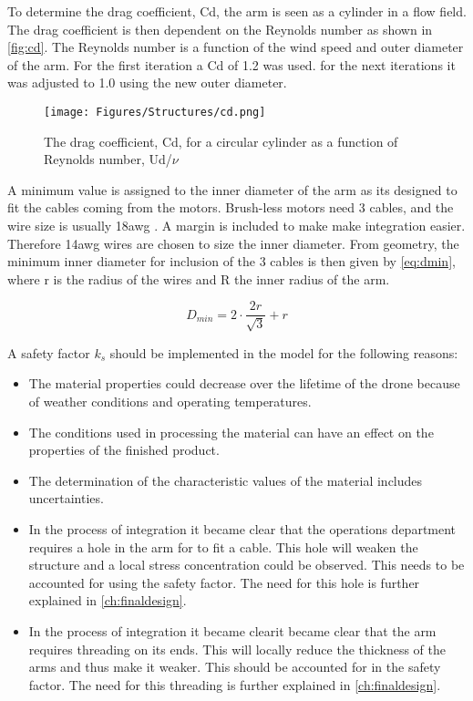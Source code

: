 To determine the drag coefficient, Cd, the arm is seen as a cylinder in a flow field. The drag coefficient is then dependent on the Reynolds number as shown in \autoref{fig:cd}. The Reynolds number is a function of the wind speed and outer diameter of the arm. For the first iteration a Cd of 1.2 was used. for the next iterations it was adjusted to 1.0 using the new outer diameter.

\begin{figure}[H]
    \centering
    \texttt{[image: Figures/Structures/cd.png]}
    \caption{The drag coefficient, Cd, for a circular cylinder as a function of Reynolds number, Ud/$\nu$ \cite{cd}}
    \label{fig:cd}
\end{figure}

A minimum value is assigned to the inner diameter of the arm as its designed to fit the cables coming from the motors. Brush-less motors need 3 cables, and the wire size is usually 18awg \cite{wiresize}. A margin is included to make make integration easier. Therefore 14awg wires are chosen to size the inner diameter. From geometry, the minimum inner diameter for inclusion of the 3 cables is then given by \autoref{eq:dmin}, where r is the radius of the wires and R the inner radius of the arm.

\begin{equation}\label{dmin}
    D_{min} = 2\cdot \frac{2r}{\sqrt{3}}+r
\end{equation}

A safety factor $k_s$ should be implemented in the model for the following reasons:
\begin{itemize}[noitemsep,nolistsep]
    \item The material properties could decrease over the lifetime of the drone because of weather conditions and operating temperatures.
    \item The conditions used in processing the material can have an effect on the properties of the finished product.
    \item The determination of the characteristic values of the material includes uncertainties.
    \item In the process of integration it became clear that the operations department requires a hole in the arm for to fit a cable. This hole will weaken the structure and a local stress concentration could be observed. This needs to be accounted for using the safety factor. The need for this hole is further explained in \autoref{ch:finaldesign}.
    \item In the process of integration it became clearit became clear that the arm requires threading on its ends. This will locally reduce the thickness of the arms and thus make it weaker. This should be accounted for in the safety factor. The need for this threading is further explained in \autoref{ch:finaldesign}.
\end{itemize}


